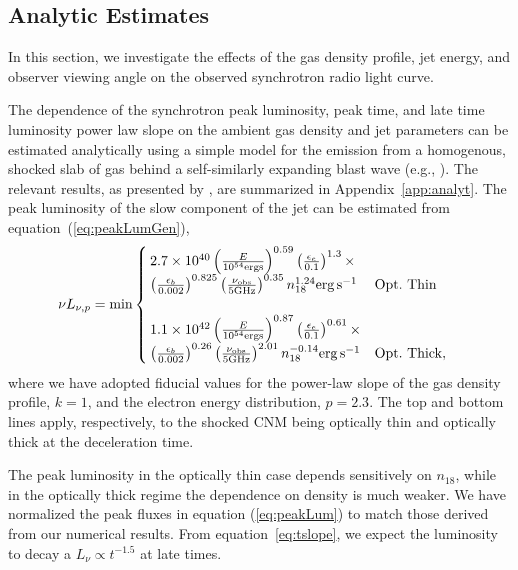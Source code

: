 \documentclass[usenatbib,fleqn]{mnras}
\begin{document}
\subsection{Analytic Estimates}
\label{sec:analyt}
In this section, we investigate the effects of the gas density
profile, jet energy, and observer viewing angle on the observed
synchrotron radio light curve.  

The dependence of the synchrotron peak luminosity, peak time, and late
time luminosity power law slope on the ambient gas density and jet
parameters can be estimated analytically using a simple model for the
emission from a homogenous, shocked slab of gas behind a
self-similarly expanding blast wave (e.g., \citealt{Sari+98,
  Granot+02}).  The relevant results, as presented by
\citet{Leventis+2012}, are summarized in Appendix~\ref{app:analyt}.
The peak luminosity of the slow component of the jet can be estimated
from equation~(\ref{eq:peakLumGen}),
\begin{align}
\nu L_{\nu, p}&=\text{min}
\begin{cases}
  2.7\times 10^{40} \left(\frac{E}{10^{54} {\rm ergs}}\right)^{0.59}
  \left(\frac{\epsilon_e}{0.1}\right)^{1.3}\times \\
  \left(\frac{\epsilon_b}{0.002}\right)^{0.825}\left(\frac{\nu_{\rm
        obs}}{5 {\rm GHz}}\right)^{0.35} n_{18}^{1.24}
  {\rm erg \, s^{-1}} & {\rm Opt.~Thin}\\\\
  1.1 \times 10^{42} \left(\frac{E}{10^{54} {\rm ergs}}\right)^{0.87}
  \left(\frac{\epsilon_e}{0.1}\right)^{0.61}\times\\
  \left(\frac{\epsilon_b}{0.002}\right)^{0.26}\left(\frac{\nu_{\rm
        obs}}{5 {\rm GHz}}\right)^{2.01} n_{18}^{-0.14} {\rm erg\,
    s^{-1}} & {\rm Opt.~Thick},
\end{cases}
\label{eq:peakLum}
\end{align}
where we have adopted fiducial values for the power-law slope of the
gas density profile, $k=1$, and the electron energy distribution,
$p=2.3$.  The top and bottom lines apply, respectively, to the shocked
CNM being optically thin and optically thick at the deceleration time.

The peak luminosity in the optically thin case depends sensitively on
$n_{18}$, while in the optically thick regime the dependence on
density is much weaker.  We have normalized the peak fluxes in
equation (\ref{eq:peakLum}) to match those derived from our numerical
results. From equation~\eqref{eq:tslope}, we expect the luminosity to
decay a $L_\nu \propto t^{-1.5}$ at late times.
\end{document}

